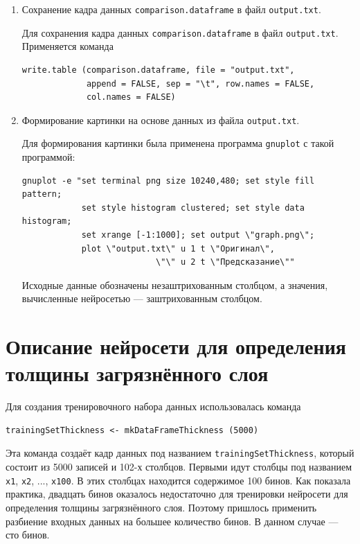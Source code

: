 \documentclass[12pt]{article}
\begin{document}
\begin{enumerate}
\begin{verbatim}
comparison.dataframe <- cbind (testSet [, 21], 
                               compute (nn, 
                                        testSet [, 1:20])$net.result)
\end{verbatim}

\item{Сохранение кадра данных \verb|comparison.dataframe| в файл \verb|output.txt|.}

  Для сохранения кадра данных \verb|comparison.dataframe| в файл \verb|output.txt|. Применяется команда

\begin{verbatim}
write.table (comparison.dataframe, file = "output.txt", 
             append = FALSE, sep = "\t", row.names = FALSE, 
             col.names = FALSE)
\end{verbatim}

\item{Формирование картинки на основе данных из файла \verb|output.txt|.}

  Для формирования картинки была применена программа \verb|gnuplot| с такой программой:

\begin{verbatim}
gnuplot -e "set terminal png size 10240,480; set style fill pattern; 
            set style histogram clustered; set style data histogram; 
            set xrange [-1:1000]; set output \"graph.png\"; 
            plot \"output.txt\" u 1 t \"Оригинал\", 
                           \"\" u 2 t \"Предсказание\""
\end{verbatim}

  Исходные данные обозначены незаштрихованным столбцом, а значения, вычисленные нейросетью --- заштрихованным столбцом.
\end{enumerate}

\section{Описание нейросети для определения толщины загрязнённого слоя}

Для создания тренировочного набора данных использовалась команда

\begin{verbatim}
trainingSetThickness <- mkDataFrameThickness (5000)
\end{verbatim}

Эта команда создаёт кадр данных под названием \verb|trainingSetThickness|, который состоит из 5000 записей и 102-х столбцов. Первыми идут столбцы под названием \verb|x1|, \verb|x2|, ..., \verb|x100|. В этих столбцах находится содержимое 100 бинов. Как показала практика, двадцать бинов оказалось недостаточно для тренировки нейросети для определения толщины загрязнённого слоя. Поэтому пришлось применить разбиение входных данных на большее количество бинов. В данном случае --- сто бинов.
\end{document}
